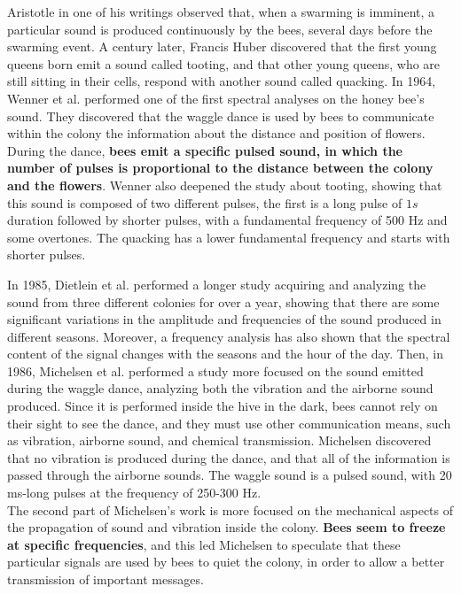 \documentclass[12pt]{report}
\begin{document}
	\par Aristotle in one of his writings observed that, when a swarming is imminent, a particular sound is produced continuously by the bees, several days before the swarming event. A century later, Francis Huber discovered that the first young queens born emit a sound called tooting, and that other young queens, who are still sitting in their cells, respond with another sound called quacking. In 1964, Wenner et al. \cite{wenner1964sound} performed one of the first spectral analyses on the honey bee's sound. They discovered that the waggle dance is used by bees to communicate within the colony the information about the distance and position of flowers. During the dance, \textbf{bees emit a specific pulsed sound, in which the number of pulses is proportional to the distance between the colony and the flowers}. Wenner also deepened the study about tooting, showing that this sound is composed of two different pulses, the first is a long pulse of $1s$ duration followed by shorter pulses, with a fundamental frequency of 500 Hz and some overtones. The quacking has a lower fundamental frequency and starts with shorter pulses.
	
	\par In 1985, Dietlein et al. \cite{dietlein1985spectral_analysis} performed a longer study acquiring and analyzing the sound from three different colonies for over a year, showing that there are some significant variations in the amplitude and frequencies of the sound produced in different seasons. Moreover, a frequency analysis has also shown that the spectral content of the signal changes with the seasons and the hour of the day. Then, in 1986, Michelsen et al. \cite{michelsen1986sound} performed a study more focused on the sound emitted during the waggle dance, analyzing both the vibration and the airborne sound produced. Since it is performed inside the hive in the dark, bees cannot rely on their sight to see the dance, and they must use other communication means, such as vibration, airborne sound, and chemical transmission. Michelsen discovered that no vibration is produced during the dance, and that all of the information is passed through the airborne sounds. The waggle sound is a pulsed sound, with 20 ms-long pulses at the frequency of 250-300 Hz.\\
	The second part of Michelsen's work is more focused on the mechanical aspects of the propagation of sound and vibration inside the colony. \textbf{Bees seem to freeze at specific frequencies}, and this led Michelsen to speculate that these particular signals are used by bees to quiet the colony, in order to allow a better transmission of important messages.
	
\end{document}
